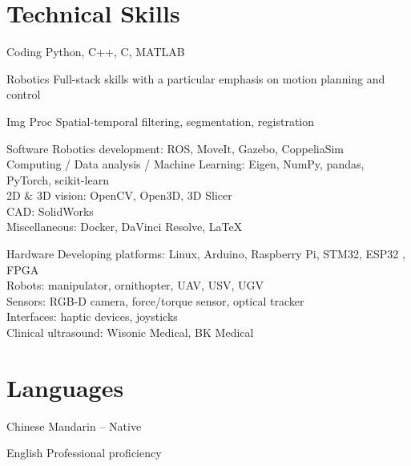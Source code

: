 \documentclass[11pt,letterpaper]{report}
\begin{document}
\section*{Technical Skills}
\begin{tablist}
	\item[Coding] \tab Python, C++, C, MATLAB
	\item[Robotics] \tab Full-stack skills with a particular emphasis on motion planning and control
	\item [Img Proc] \tab Spatial-temporal filtering, segmentation, registration
	\item[Software] \tab Robotics development: ROS, MoveIt, Gazebo, CoppeliaSim\\
	Computing / Data analysis / Machine Learning: Eigen, NumPy, pandas, PyTorch, scikit-learn\\
	2D \& 3D vision: OpenCV, Open3D, 3D Slicer\\
	CAD: SolidWorks\\
	Miscellaneous: Docker, DaVinci Resolve, \LaTeX
	\item[Hardware] \tab Developing platforms: Linux, Arduino, Raspberry Pi, STM32, ESP32	, FPGA\\
	Robots: manipulator, ornithopter, UAV, USV, UGV\\ 
	Sensors: RGB-D camera, force/torque sensor, optical tracker\\
	Interfaces: haptic devices, joysticks\\
	Clinical ultrasound: Wisonic Medical, BK Medical
\end{tablist}


\section*{Languages}
\begin{tablist}
	\item[Chinese] \tab Mandarin -- Native
	\item[English] \tab Professional proficiency
\end{tablist}
\newpage
\end{document}
